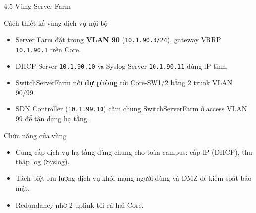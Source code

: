 \begin{frame}{4.5 Vùng Server Farm}
    \small
    \begin{block}{Cách thiết kế vùng dịch vụ nội bộ}
        \begin{itemize}
            \item Server Farm đặt trong \textbf{VLAN 90}
                  (\texttt{10.1.90.0/24}), gateway VRRP
                  \texttt{10.1.90.1} trên Core.
            \item DHCP-Server \texttt{10.1.90.10} và Syslog-Server
                  \texttt{10.1.90.11} dùng IP tĩnh.
            \item SwitchServerFarm nối \textbf{dự phòng} tới Core-SW1/2
                  bằng 2 trunk VLAN 90/99.
            \item SDN Controller (\texttt{10.1.99.10}) cắm chung
                  SwitchServerFarm ở access VLAN 99 để tận dụng hạ tầng.
        \end{itemize}
    \end{block}
    \vspace{0.12cm}
    \begin{block}{Chức năng của vùng}
        \begin{itemize}
            \item Cung cấp dịch vụ hạ tầng dùng chung cho toàn campus:
                  cấp IP (DHCP), thu thập log (Syslog).
            \item Tách biệt lưu lượng dịch vụ khỏi mạng người dùng và
                  DMZ để kiểm soát bảo mật.
            \item Redundancy nhờ 2 uplink tới cả hai Core.
        \end{itemize}
    \end{block}
\end{frame}

